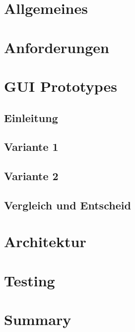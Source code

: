 \documentclass[10pt,a4paper,twoside]{article}
\begin{document}


\setcounter{tocdepth}{5} %
\setcounter{secnumdepth}{5} %
\tableofcontents
\newpage 
\section{Allgemeines}

\section{Anforderungen}

\section{GUI Prototypes}
\subsection{Einleitung}

\subsection{Variante 1}

\newpage
\subsection{Variante 2}

\newpage
\subsection{Vergleich und Entscheid}

\newpage
\section{Architektur}

\newpage
\section{Testing}

\newpage
\section{Summary}

\newpage
\appendix
\listoffigures
\end{document}
